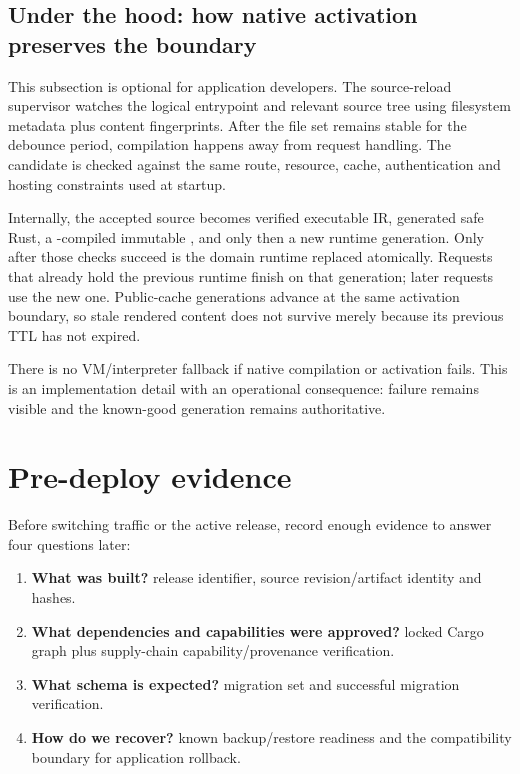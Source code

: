 \subsection*{Under the hood: how native activation preserves the boundary}

This subsection is optional for application developers. The source-reload supervisor watches the logical entrypoint and relevant source tree using filesystem metadata plus content fingerprints. After the file set remains stable for the debounce period, compilation happens away from request handling. The candidate is checked against the same route, resource, cache, authentication and hosting constraints used at startup.

Internally, the accepted source becomes verified executable IR, generated safe Rust, a -compiled immutable , and only then a new runtime generation. Only after those checks succeed is the domain runtime replaced atomically. Requests that already hold the previous runtime finish on that generation; later requests use the new one. Public-cache generations advance at the same activation boundary, so stale rendered content does not survive merely because its previous TTL has not expired.

There is no VM/interpreter fallback if native compilation or activation fails. This is an implementation detail with an operational consequence: failure remains visible and the known-good generation remains authoritative.

\section{Pre-deploy evidence}

Before switching traffic or the active release, record enough evidence to answer four questions later:

\begin{enumerate}
  \item \textbf{What was built?} release identifier, source revision/artifact identity and hashes.
  \item \textbf{What dependencies and capabilities were approved?} locked Cargo graph plus supply-chain capability/provenance verification.
  \item \textbf{What schema is expected?} migration set and successful migration verification.
  \item \textbf{How do we recover?} known backup/restore readiness and the compatibility boundary for application rollback.
\end{enumerate}

